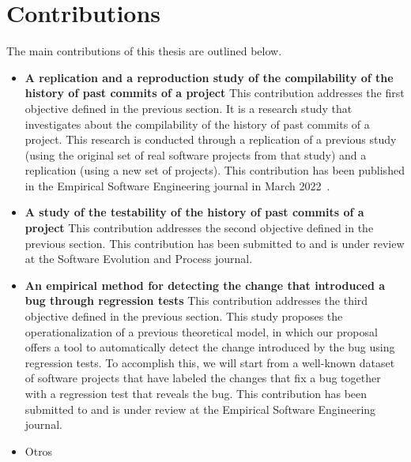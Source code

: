 \section{Contributions}

The main contributions of this thesis are outlined below.

\begin{itemize}
    \item \textbf{A replication and a reproduction study of the compilability of the history of past commits of a project}
    This contribution addresses the first objective defined in the previous section.
    It is a research study that investigates about the compilability of the history of past commits of a project.
    This research is conducted through a replication of a previous study~\cite{tufano2017there} (using the original set of real software projects from that study) and a replication (using a new set of projects).
    This contribution has been published in the Empirical Software Engineering journal in March 2022~\cite{maes2022revisiting}.
    \item \textbf{A study of the testability of the history of past commits of a project}
    This contribution addresses the second objective defined in the previous section.
    This contribution has been submitted to and is under review at the Software Evolution and Process journal.
    \item \textbf{An empirical method for detecting the change that introduced a bug through regression tests}
    This contribution addresses the third objective defined in the previous section. 
    This study proposes the operationalization of a previous theoretical model, in which our proposal offers a tool to automatically detect the change introduced by the bug using regression tests. To accomplish this, we will start from a well-known dataset of software projects that have labeled the changes that fix a bug together with a regression test that reveals the  bug.
    This contribution has been submitted to and is under review at the Empirical Software Engineering journal.
    \item{Otros} 
\end{itemize}

